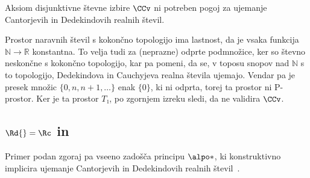 

\begin{izrek}
  Aksiom disjunktivne števne izbire \(\CCv\) ni potreben pogoj za ujemanje
  Cantorjevih in Dedekindovih realnih števil.
\end{izrek}
\begin{dokaz}
  Prostor naravnih števil s kokončno topologijo ima lastnost, da je vsaka
  funkcija \(ℕ → ℝ\) konstantna. To velja tudi za (neprazne) odprte podmnožice,
  ker so števno neskončne s kokončno topologijo, kar pa pomeni, da se, v toposu
  snopov nad \(ℕ\) s to topologijo, Dedekindova in Cauchyjeva realna števila
  ujemajo. Vendar pa je presek množic \(\{0, n, n+1, …\} \) enak \(\{0\}\), ki
  ni odprta, torej ta prostor ni P-prostor. Ker je ta prostor \(T₁\), po
  zgornjem izreku sledi, da ne validira \(\CCv\).
\end{dokaz}


\subsection{\(\Rd{} = \Rc\) in \alpo*}

Primer podan zgoraj pa vseeno zadošča principu \(\alpo*\), ki konstruktivno
implicira ujemanje Cantorjevih in Dedekindovih realnih
števil~\cite{Birchfield24}.

